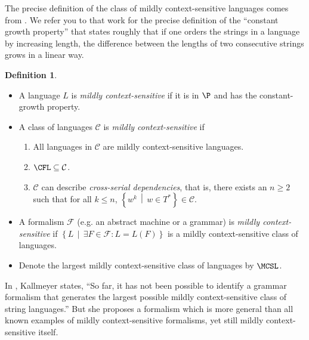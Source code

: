 \documentclass{article}
\theoremstyle{definition}
\newtheorem{definition}{Definition}
\newcommand{\lb}{\left\{} %
\newcommand{\rb}{\right\}} %
\newcommand{\st}{\,\middle|\,} %
\begin{document}
The precise definition of the class of mildly context-sensitive languages comes from \cite[Definition~1]{kallmeyer}.
We refer you to that work for the precise definition of the ``constant growth property'' that states roughly that if one orders the strings in a language by increasing length, the difference between the lengths of two consecutive strings grows in a linear way.
\begin{definition}\mbox{}
  \begin{itemize}
  \item A language $L$ is \emph{mildly context-sensitive} if it is in $\P$ and has the constant-growth property.
  \item A class of languages $\mathcal{C}$ is \emph{mildly context-sensitive} if
    \begin{enumerate}
    \item All languages in $\mathcal{C}$ are mildly context-sensitive languages.
    \item $\CFL\subseteq\mathcal{C}$.
    \item $\mathcal{C}$ can describe \emph{cross-serial dependencies}, that is, there exists an $n\geq 2$ such that for all $k\leq n$, $\lb w^k \st w\in T^*\rb\in\mathcal{C}$.
    \end{enumerate}
  \item A formalism $\mathcal{F}$ (e.g. an abstract machine or a grammar) is \emph{mildly context-sensitive} if $\lb L \st \exists F\in\mathcal{F}\colon L = L(F)\rb$ is a mildly context-sensitive class of languages.
  \item Denote the largest mildly context-sensitive class of languages by $\MCSL$.
  \end{itemize}
\end{definition}

In \cite{kallmeyer}, Kallmeyer states, ``So far, it has not been possible to identify a grammar formalism that generates the largest possible mildly context-sensitive class of string languages.''
But she proposes a formalism which is more general than all known examples of mildly context-sensitive formalisms, yet still mildly context-sensitive itself.
\end{document}
